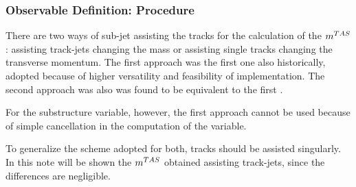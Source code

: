 \subsubsection{Observable Definition: Procedure}


There are two ways of sub-jet assisting the tracks for the calculation of the $m^{TAS}$: assisting track-jets changing the mass or assisting single tracks changing the transverse momentum. The first approach was the first one also historically, adopted because of higher versatility and feasibility of implementation. The second approach was also was found to be equivalent to the first \cite{presentation}.

For the substructure variable, however, the first approach cannot be used because of simple cancellation in the computation of the variable.

To generalize the scheme adopted for both, tracks should be assisted singularly. In this note will be shown the $m^{TAS}$ obtained assisting track-jets, since the differences are negligible.


